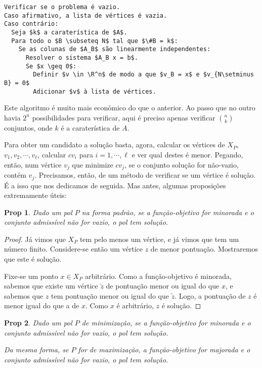 \documentclass{article}
\newcommand{\R}{\mathbb{R}}
\newtheorem{prop}{Prop}
\theoremstyle{definition}
\begin{document}
	\begin{lstlisting}[mathescape=true, keepspaces=true]
Verificar se o problema é vazio.
Caso afirmativo, a lista de vértices é vazia.
Caso contrário:
  Seja $k$ a caraterística de $A$.
  Para todo o $B \subseteq N$ tal que $\#B = k$:
    Se as colunas de $A_B$ são linearmente independentes:
      Resolver o sistema $A_B x = b$.
      Se $x \geq 0$:
        Definir $v \in \R^n$ de modo a que $v_B = x$ e $v_{N\setminus B} = 0$
        Adicionar $v$ à lista de vértices.
	\end{lstlisting}
	
	Este algoritmo é muito mais económico do que o anterior. Ao passo que no outro havia $2^n$ possibilidades para verificar, aqui é preciso apenas verificar $\binom{n}{k}$ conjuntos, onde $k$ é a caraterística de $A$.
	
	Para obter um candidato a solução basta, agora, calcular os vértices de $X_P$, $v_1, v_2, \cdots, v_\ell$, calcular $c v_i$ para $i = 1, \cdots, \ell$ e ver qual destes é menor. Pegando, então, num vértice $v_j$ que minimize $c v_j$, se o conjunto solução for não-vazio, contém $v_j$. Precisamos, então, de um método de verificar se um vértice é solução. É a isso que nos dedicamos de seguida. Mas antes, algumas proposições extremamente úteis:
	
	\begin{prop}
	Dado um pol $P$ na forma padrão, se a função-objetivo for minorada e o conjunto admissível não for vazio, o pol tem solução.
	\end{prop}
	
	\begin{proof}
	Já vimos que $X_P$ tem pelo menos um vértice, e já vimos que tem um número finito. Considere-se então um vértice $z$ de menor pontuação. Mostraremos que este é solução.
	
	Fixe-se um ponto $x \in X_P$ arbitrário. Como a função-objetivo é minorada, sabemos que existe um vértice $\tilde z$ de pontuação menor ou igual do que $x$, e sabemos que $z$ tem pontuação menor ou igual do que $\tilde z$. Logo, a pontuação de $z$ é menor igual do que a de $x$. Como $x$ é arbitrário, $z$ é solução.
	\end{proof}
	
	\begin{prop}
	Dado um pol $P$ de minimização, se a função-objetivo for minorada e o conjunto admissível não for vazio, o pol tem solução.
	
	Da mesma forma, se $P$ for de maximização, a função-objetivo for majorada e  o conjunto admissível não for vazio, o pol tem solução.
	\end{prop}
	
\end{document}
